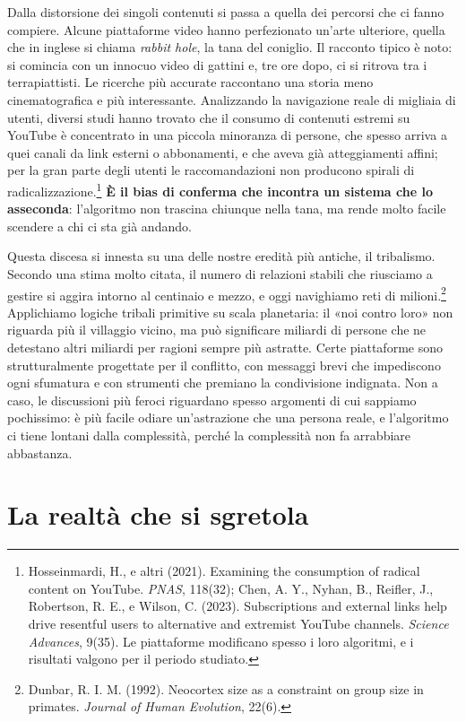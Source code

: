 Dalla distorsione dei singoli contenuti si passa a quella dei percorsi che ci fanno compiere. Alcune piattaforme video hanno perfezionato un'arte ulteriore, quella che in inglese si chiama \textit{rabbit hole}, la tana del coniglio. Il racconto tipico è noto: si comincia con un innocuo video di gattini e, tre ore dopo, ci si ritrova tra i terrapiattisti. Le ricerche più accurate raccontano una storia meno cinematografica e più interessante. Analizzando la navigazione reale di migliaia di utenti, diversi studi hanno trovato che il consumo di contenuti estremi su YouTube è concentrato in una piccola minoranza di persone, che spesso arriva a quei canali da link esterni o abbonamenti, e che aveva già atteggiamenti affini; per la gran parte degli utenti le raccomandazioni non producono spirali di radicalizzazione.\footnote{Hosseinmardi, H., e altri (2021). Examining the consumption of radical content on YouTube. \textit{PNAS}, 118(32); Chen, A. Y., Nyhan, B., Reifler, J., Robertson, R. E., e Wilson, C. (2023). Subscriptions and external links help drive resentful users to alternative and extremist YouTube channels. \textit{Science Advances}, 9(35). Le piattaforme modificano spesso i loro algoritmi, e i risultati valgono per il periodo studiato.} \textbf{È il bias di conferma che incontra un sistema che lo asseconda}: l'algoritmo non trascina chiunque nella tana, ma rende molto facile scendere a chi ci sta già andando.

Questa discesa si innesta su una delle nostre eredità più antiche, il tribalismo. Secondo una stima molto citata, il numero di relazioni stabili che riusciamo a gestire si aggira intorno al centinaio e mezzo, e oggi navighiamo reti di milioni.\footnote{Dunbar, R. I. M. (1992). Neocortex size as a constraint on group size in primates. \textit{Journal of Human Evolution}, 22(6).} Applichiamo logiche tribali primitive su scala planetaria: il «noi contro loro» non riguarda più il villaggio vicino, ma può significare miliardi di persone che ne detestano altri miliardi per ragioni sempre più astratte. Certe piattaforme sono strutturalmente progettate per il conflitto, con messaggi brevi che impediscono ogni sfumatura e con strumenti che premiano la condivisione indignata. Non a caso, le discussioni più feroci riguardano spesso argomenti di cui sappiamo pochissimo: è più facile odiare un'astrazione che una persona reale, e l'algoritmo ci tiene lontani dalla complessità, perché la complessità non fa arrabbiare abbastanza.

\section{La realtà che si sgretola}

